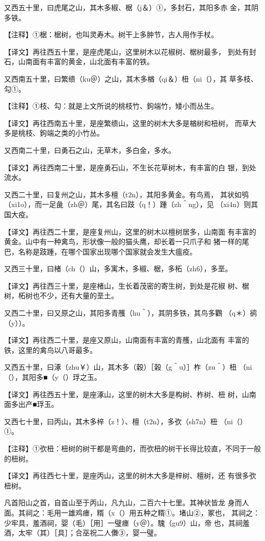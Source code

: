 \documentclass[a4paper,12pt,UTF8,twoside]{ctexbook}
\begin{document}
又西五十里，曰虎尾之山，其木多椒、椐（j＆）①，多封石，其阳多赤 金，其阴多铁。

【注释】①椐：椐树，也叫灵寿木。树干上多肿节，古人用作手杖。

【译文】再往西五十里，是座虎尾山，这里树木以花椒树、椐树最多， 到处有封石，山南面有丰富的黄金，山北面有丰富的铁。

又西南五十里，曰繁缋（ku＠）之山，其木多楢（qi＆）杻（ni（），其 草多枝、勾①。

【注释】①枝、勾：就是上文所说的桃枝竹、鉤端竹，矮小而丛生。

【译文】再往西南五十里，是座繁缋山，这里的树木大多是楢树和杻树， 而草大多是桃枝、鉤端之类的小竹丛。

又西南二十里，曰勇石之山，无草木，多白金，多水。

【译文】再往西南二十里，是座勇石山，不生长花草树木，有丰富的白 银，到处流水。

又西二十里，曰复州之山，其木多檀（t2n），其阳多黄金。有鸟焉， 其状如鸮（xi1o），而一足彘（zh＠）尾，其名曰跂（q！）踵（zh＾ng），见 （xi4n）则其国大疫。

【译文】再往西二十里，是座复州山，这里的树木以檀树居多，山南面 有丰富的黄金。山中有一种禽鸟，形状像一般的猫头鹰，却长着一只爪子和 猪一样的尾巴，名称是跂踵，在哪个国家出现哪个国家就会发生大瘟疫。

又西三十里，曰楮（ch（）山，多寓木，多椒、椐，多柘（zh6），多垩。

【译文】再往西三十里，是座楮山，生长着茂密的寄生树，到处是花椒 树、椐树，柘树也不少，还有大量的垩土。

又西二十里，曰又原之山，其阳多青雘（hu＾），其阴多铁，其鸟多鸜 （q＊）鹆（y））。

【译文】再往西二十里，是座又原山，山南面有丰富的青雘，山北面有 丰富的铁，这里的禽鸟以八哥最多。

又西五十里，曰涿（zhu￥）山，其木多（穀）［榖（g＾u）］柞（zu＾）杻 （ni（），其阳多■（y（）琈之玉。

【译文】再往西五十里，是座涿山，这里的树木大多是构树、柞树、杻 树，山南面多出产■琈玉。

又西七十里，曰丙山，其木多梓（z！）、檀（t2n），多弞（sh7n）杻 （ni（）①。

【注释】①弞杻：杻树的树干都是弯曲的，而弞杻的树干长得比较直，不同于一般的杻树。

【译文】再往西七十里，是座丙山，这里的树木大多是梓树、檀树，还 有很多弞杻树。

凡首阳山之首，自首山至于丙山，凡九山，二百六十七里。其神状皆龙 身而人面。其祠之：毛用一雄鸡瘗，糈（x（）用五种之糈①。堵山②，冢也， 其祠之：少牢具，羞酒祠，婴（毛）［用］一璧瘗（y＠）。騩（gu9）山，帝 也，其祠羞酒，太牢（其）［具］；合巫祝二人儛③，婴一璧。
\end{document}
